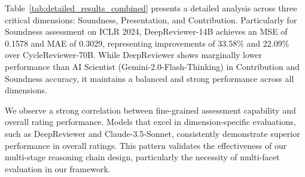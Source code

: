 \documentclass{article}
\begin{document}
Table~\ref{tab:detailed_results_combined} presents a detailed analysis across three critical dimensions: Soundness, Presentation, and Contribution. Particularly for Soundness assessment on ICLR 2024, DeepReviewer-14B achieves an MSE of 0.1578 and MAE of 0.3029, representing improvements of 33.58$\%$ and 22.09$\%$ over CycleReviewer-70B. While DeepReviewer shows marginally lower performance than AI Scientist (Gemini-2.0-Flash-Thinking) in Contribution and Soundness accuracy, it maintains a balanced and strong performance across all dimensions. 

We observe a strong correlation between fine-grained assessment capability and overall rating performance. Models that excel in dimension-specific evaluations, such as DeepReviewer and Claude-3.5-Sonnet, consistently demonstrate superior performance in overall ratings. This pattern validates the effectiveness of our multi-stage reasoning chain design, particularly the necessity of multi-facet evaluation in our framework. 



\end{document}
